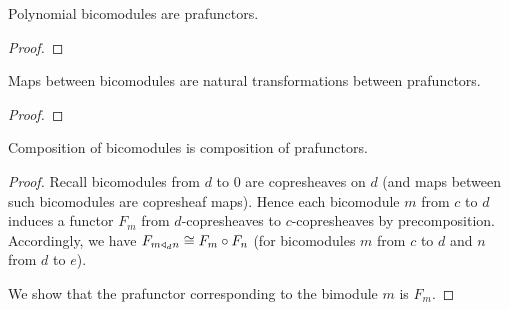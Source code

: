 \documentclass{amsart}
\begin{document}
\begin{prop}
  Polynomial bicomodules are prafunctors.
\end{prop}
\begin{proof}
  
\end{proof}

\begin{prop}
  Maps between bicomodules are natural transformations between prafunctors.
\end{prop}
\begin{proof}
  
\end{proof}

\begin{prop}
  Composition of bicomodules is composition of prafunctors.
\end{prop}
\begin{proof}
  Recall bicomodules from $d$ to $0$ are copresheaves on $d$ (and maps
  between such bicomodules are copresheaf maps). Hence each bicomodule
  $m$ from $c$ to $d$ induces a functor $F_m$ from $d$-copresheaves to
  $c$-copresheaves by precomposition. Accordingly, we have
  $F_{m \mathrel{\triangleleft}_d n} \cong F_m \circ F_n$ (for bicomodules $m$
  from $c$ to $d$ and $n$ from $d$ to $e$).
  
  We show that the prafunctor corresponding to the bimodule $m$ is $F_m$. 
\end{proof}
\end{document}
